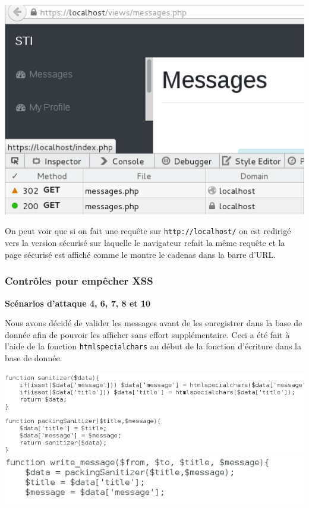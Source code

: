 \documentclass{article}
\begin{document}
\includegraphics{images/ssl1.png}

On peut voir que si on fait une requête sur \texttt{http://localhost/}
on est redirigé vers la version sécurisé sur laquelle le navigateur
refait la même requête et la page sécurisé est affiché comme le montre
le cadenas dans la barre d'URL.

\hypertarget{contruxf4les-pour-empuxeacher-xss}{%
\subsubsection{Contrôles pour empêcher
XSS}\label{contruxf4les-pour-empuxeacher-xss}}

\textbf{Scénarios d'attaque 4, 6, 7, 8 et 10}

Nous avons décidé de valider les messages avant de les enregistrer dans
la base de donnée afin de pouvoir les afficher sans effort
supplémentaire. Ceci a été fait à l'aide de la fonction
\texttt{htmlspecialchars} au début de la fonction d'écriture dans la
base de donnée.

\includegraphics{images/sanitize.PNG}
\includegraphics{images/sanitize3.PNG}
\end{document}
